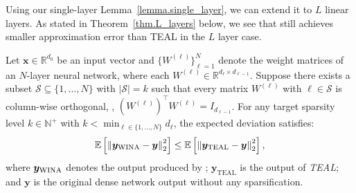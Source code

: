 {	Using our single-layer Lemma~\ref{lemma.single_layer}, we can extend it to $L$ linear layers. As stated in Theorem~\ref{thm.L_layers} below, we see that \algacro{} still achieves smaller approximation error than TEAL in the $L$ layer case.
	\begin{theorem}\label{thm.L_layers}
			Let $\bm{x} \in \mathbb{R}^{d_0}$ be an input vector and $\{W^{(\ell)}\}_{\ell=1}^N$ denote the weight matrices of an $N$-layer neural network, where each $W^{(\ell)} \in \mathbb{R}^{d_\ell \times d_{\ell-1}}$. Suppose there exists a subset $\mathcal{S} \subseteq \{1,\ldots,N\}$ with $|\mathcal{S}| = k$ such that every matrix $W^{(\ell)}$ with $\ell \in \mathcal{S}$ is column-wise orthogonal, \ie, $(W^{(\ell)})^\top W^{(\ell)} = I_{d_{\ell-1}}$. For any target sparsity level $k \in \mathbb{N}^+$ with $k < \min_{\ell \in \{1,\ldots,N\}} d_\ell$, the expected deviation satisfies:
			\begin{equation}\label{eq:sparse-error-bound}
				\E\left[\left\|\bm{y}_\text{\algacro{}} - \bm{y}\right\|_2^2\right] \leq 
				\E\left[\left\|\bm{y}_\text{TEAL} - \bm{y}\right\|_2^2\right],
			\end{equation}
			where $\bm{y}_\text{\algacro{}}$ denotes the output produced by \textit{\algacro{}}; $\bm{y}_\text{TEAL}$ is the output of \textit{TEAL}; and $\bm{y}$ is the original dense network output without any sparsification.
	\end{theorem} 
	
}
